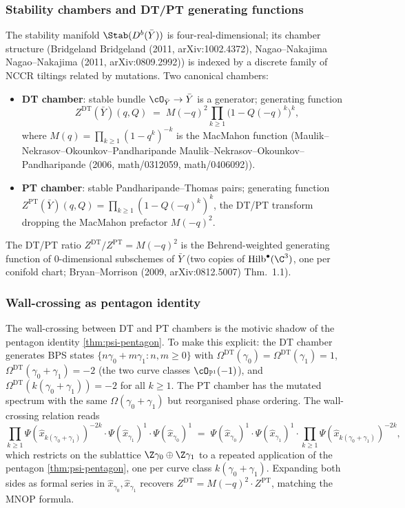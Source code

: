 \subsubsection{Stability chambers and DT/PT generating functions}

The stability manifold $\Stab(D^b(\bar{Y}))$ is four-real-dimensional;
its chamber structure (Bridgeland Bridgeland (2011, arXiv:1002.4372),
Nagao--Nakajima Nagao--Nakajima (2011, arXiv:0809.2992)) is indexed by a discrete
family of NCCR tiltings related by mutations. Two canonical chambers:
\begin{itemize}[leftmargin=2em]
 \item \textbf{DT chamber}: stable bundle $\cO_{\bar{Y}} \to \bar{Y}$
 is a generator; generating function
 \[
 Z^{\mathrm{DT}}(\bar{Y})(q, Q) \;=\; M(-q)^{2} \prod_{k \geq 1}\big(1 - Q(-q)^k\big)^{k},
 \]
 where $M(q) = \prod_{k \geq 1}(1 - q^k)^{-k}$ is the MacMahon
 function (Maulik--Nekrasov--Okounkov--Pandharipande
 Maulik--Nekrasov--Okounkov--Pandharipande (2006, math/0312059, math/0406092)).
 \item \textbf{PT chamber}: stable Pandharipande--Thomas pairs;
 generating function
 $Z^{\mathrm{PT}}(\bar{Y})(q, Q) = \prod_{k \geq 1}(1 - Q(-q)^k)^{k}$, the
 DT/PT transform dropping the MacMahon prefactor $M(-q)^2$.
\end{itemize}
The DT/PT ratio $Z^{\mathrm{DT}}/Z^{\mathrm{PT}} = M(-q)^2$ is the Behrend-weighted
generating function of $0$-dimensional subschemes of $\bar{Y}$
(two copies of $\mathrm{Hilb}^\bullet(\C^3)$, one per conifold chart;
Bryan--Morrison (2009, arXiv:0812.5007) Thm.~1.1).

\subsubsection{Wall-crossing as pentagon identity}

The wall-crossing between DT and PT chambers is the motivic shadow of
the pentagon identity \cref{thm:psi-pentagon}. To make this explicit:
the DT chamber generates BPS states $\{n \gamma_0 + m \gamma_1 : n, m \geq 0\}$
with
$\Omega^{\mathrm{DT}}(\gamma_0) = \Omega^{\mathrm{DT}}(\gamma_1) = 1$,
$\Omega^{\mathrm{DT}}(\gamma_0 + \gamma_1) = -2$ (the two curve classes
$\cO_{\mathbb P^1}(-1)$), and $\Omega^{\mathrm{DT}}(k(\gamma_0 + \gamma_1)) = -2$
for all $k \geq 1$. The PT chamber has the mutated spectrum with the
same $\Omega(\gamma_0 + \gamma_1)$ but reorganised phase ordering.
The wall-crossing relation reads
\[
 \prod_{k \geq 1} \Psi(\hat{x}_{k(\gamma_0 + \gamma_1)})^{-2k}
 \cdot \Psi(\hat{x}_{\gamma_1})^{1} \cdot \Psi(\hat{x}_{\gamma_0})^{1}
 \;=\;
 \Psi(\hat{x}_{\gamma_0})^{1} \cdot \Psi(\hat{x}_{\gamma_1})^{1} \cdot \prod_{k \geq 1} \Psi(\hat{x}_{k(\gamma_0 + \gamma_1)})^{-2k},
\]
which restricts on the sublattice $\Z\gamma_0 \oplus \Z\gamma_1$ to a
repeated application of the pentagon \cref{thm:psi-pentagon}, one
per curve class $k(\gamma_0 + \gamma_1)$. Expanding both sides as
formal series in $\hat{x}_{\gamma_0}, \hat{x}_{\gamma_1}$ recovers
$Z^{\mathrm{DT}} = M(-q)^2 \cdot Z^{\mathrm{PT}}$, matching the MNOP
formula.

